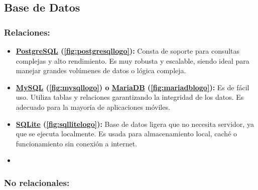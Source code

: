 \subsection{Base de Datos}

    \subsubsection{Relaciones:}

    \begin{itemize}

        \item \textbf{\href{https://www.postgresql.org/}{PostgreSQL} \cite{postgresql} (\ref{fig:postgresqllogo}):} Consta de soporte para consultas complejas y alto rendimiento. Es muy robusta y escalable, siendo ideal para manejar grandes volúmenes de datos o lógica compleja.
   
        \item \textbf{\href{https://www.mysql.com/}{MySQL} \cite{mysql2026home} (\ref{fig:mysqllogo}) o \href{https://mariadb.org/}{MariaDB} \cite{mariadb2026home} (\ref{fig:mariadblogo}):} Es de fácil uso. Utiliza tablas y relaciones garantizando la integridad de los datos. Es adecuado para la mayoría de aplicaciones móviles.

        \item \textbf{\href{https://sqlite.org/}{SQLite} \cite{sqllite2026home} (\ref{fig:sqllitelogo}):} Base de datos ligera que no necesita servidor, ya que se ejecuta localmente. Es usada para almacenamiento local, caché o funcionamiento sin conexión a internet.
        \item 
    \end{itemize}


    \subsubsection{No relacionales:}

